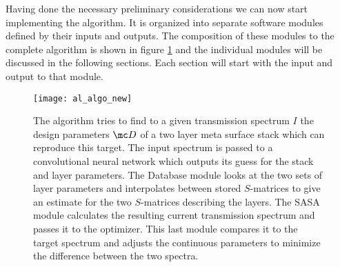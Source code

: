 Having done the necessary preliminary considerations we can now start implementing the algorithm. It is organized into separate software modules defined by their inputs and outputs. The composition of these modules to the complete algorithm is shown in figure \ref{fig:al:algo} and the individual modules will be discussed in the following sections. Each section will start with the input and output to that module. 

\begin{figure}[H]
    \centering
    \texttt{[image: al\_algo\_new]}
    \caption[]{The algorithm tries to find to a given transmission spectrum $I$ the design parameters $\mc D$ of a two layer meta surface stack which can reproduce this target. The input spectrum is passed to a convolutional neural network which outputs its guess for the stack and layer parameters. The Database module looks at the two sets of layer parameters and interpolates between stored $S$-matrices to give an estimate for the two $S$-matrices describing the layers. The SASA module calculates the resulting current transmission spectrum and passes it to the optimizer. This last module compares it to the target spectrum and adjusts the continuous parameters to minimize the difference between the two spectra.}
    \label{fig:al:algo}
\end{figure}
\vspace{0.4cm}


